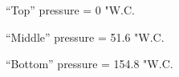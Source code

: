 





``Top'' pressure = 0 "W.C.

``Middle'' pressure = 51.6 "W.C.

``Bottom'' pressure = 154.8 "W.C.












